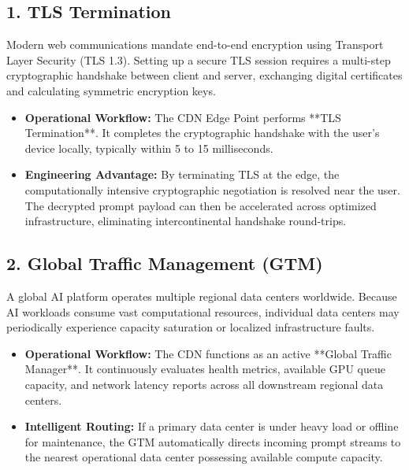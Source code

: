 \documentclass[12pt,a4paper]{report}
\begin{document}
\subsection{1. TLS Termination}
Modern web communications mandate end-to-end encryption using Transport Layer Security (TLS 1.3). Setting up a secure TLS session requires a multi-step cryptographic handshake between client and server, exchanging digital certificates and calculating symmetric encryption keys.
\begin{itemize}[leftmargin=1.2cm]
    \item \textbf{Operational Workflow:} The CDN Edge Point performs **TLS Termination**. It completes the cryptographic handshake with the user's device locally, typically within 5 to 15 milliseconds.
    \item \textbf{Engineering Advantage:} By terminating TLS at the edge, the computationally intensive cryptographic negotiation is resolved near the user. The decrypted prompt payload can then be accelerated across optimized infrastructure, eliminating intercontinental handshake round-trips.
\end{itemize}

\subsection{2. Global Traffic Management (GTM)}
A global AI platform operates multiple regional data centers worldwide. Because AI workloads consume vast computational resources, individual data centers may periodically experience capacity saturation or localized infrastructure faults.
\begin{itemize}[leftmargin=1.2cm]
    \item \textbf{Operational Workflow:} The CDN functions as an active **Global Traffic Manager**. It continuously evaluates health metrics, available GPU queue capacity, and network latency reports across all downstream regional data centers.
    \item \textbf{Intelligent Routing:} If a primary data center is under heavy load or offline for maintenance, the GTM automatically directs incoming prompt streams to the nearest operational data center possessing available compute capacity.
\end{itemize}
\end{document}

